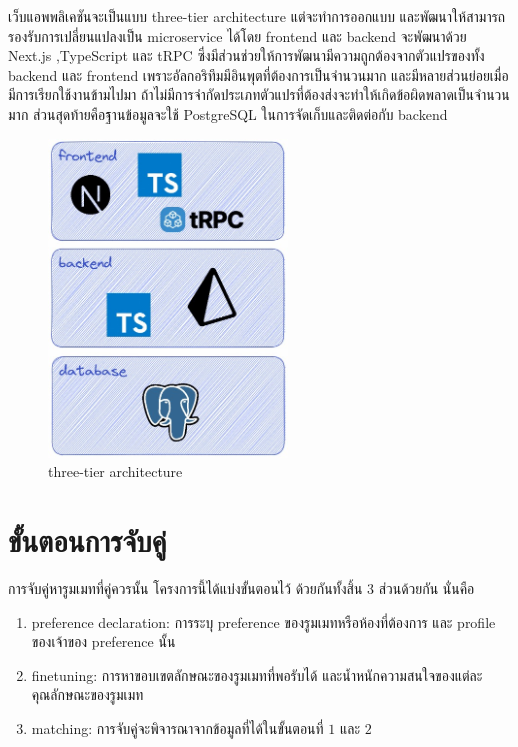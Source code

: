 เว็บแอพพลิเคชันจะเป็นแบบ three-tier architecture แต่จะทำการออกแบบ และพัฒนาให้สามารถรองรับการเปลี่ยนแปลงเป็น microservice ได้โดย 
frontend และ backend จะพัฒนาด้วย Next.js ,TypeScript และ tRPC ซึ่งมีส่วนช่วยให้การพัฒนามีความถูกต้องจากตัวแปรของทั้ง backend และ 
frontend เพราะอัลกอริทึมมีอินพุตที่ต้องการเป็นจำนวนมาก และมีหลายส่วนย่อยเมื่อมีการเรียกใช้งานข้ามไปมา ถ้าไม่มีการจำกัดประเภทตัวแปรที่ต้องส่งจะทำให้เกิดข้อผิดพลาดเป็นจำนวนมาก
ส่วนสุดท้ายคือฐานข้อมูลจะใช้ PostgreSQL ในการจัดเก็บและติดต่อกับ backend


\begin{figure}[ht]
  \begin{center}
    \includegraphics[width=2.5in]{photo/diagram/app-arch.jpeg}
  \end{center}
  \caption{three-tier architecture}
  \label{fig:three-tier}
\end{figure}

\section{ขั้นตอนการจับคู่}
การจับคู่หารูมเมทที่คู่ควรนั้น โครงการนี้ได้แบ่งขั้นตอนไว้ ด้วยกันทั้งสิ้น 3 ส่วนด้วยกัน นั่นคือ
\begin{enumerate}
  \item preference declaration: การระบุ preference ของรูมเมทหรือห้องที่ต้องการ และ profile ของเจ้าของ preference นั้น 
  \item finetuning: การหาขอบเขตลักษณะของรูมเมทที่พอรับได้ และน้ำหนักความสนใจของแต่ละคุณลักษณะของรูมเมท
  \item matching: การจับคู่จะพิจารณาจากข้อมูลที่ได้ในขั้นตอนที่ $1$ และ $2$
\end{enumerate}

